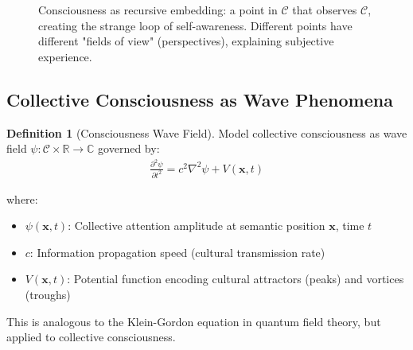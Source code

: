\documentclass[11pt,a4paper]{article}
\theoremstyle{definition}
\newtheorem{definition}{Definition}[section]
\theoremstyle{remark}
\newcommand{\RR}{\mathbb{R}}
\newcommand{\CC}{\mathcal{C}}
\newcommand{\cc}{\mathbf{c}}
\begin{document}
\begin{figure}[H]
\centering
{}
\caption{Consciousness as recursive embedding: a point in \(\CC\) that observes \(\CC\), creating the strange loop of self-awareness. Different points have different "fields of view" (perspectives), explaining subjective experience.}
\label{fig:recursive_consciousness}
\end{figure}

\subsection{Collective Consciousness as Wave Phenomena}

\begin{definition}[Consciousness Wave Field]
Model collective consciousness as wave field \(\psi: \CC \times \RR \rightarrow \mathbb{C}\) governed by:
\begin{align}
\frac{\partial^2 \psi}{\partial t^2} = c^2 \nabla^2 \psi + V(\mathbf{x}, t)
\end{align}

where:
\begin{itemize}
\item \(\psi(\mathbf{x}, t)\): Collective attention amplitude at semantic position \(\mathbf{x}\), time \(t\)
\item \(c\): Information propagation speed (cultural transmission rate)
\item \(V(\mathbf{x}, t)\): Potential function encoding cultural attractors (peaks) and vortices (troughs)
\end{itemize}

This is analogous to the Klein-Gordon equation in quantum field theory, but applied to collective consciousness.
\end{definition}
\end{document}
